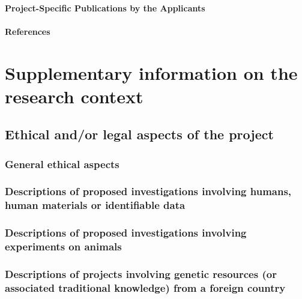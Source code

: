 \documentclass{scrartcl}
\begin{document}
\paragraph*{Project-Specific Publications by the Applicants}
\label{sec:bib}
\nocite{Desiro:18}

\printbibliography[keyword={DFG},heading=none,resetnumbers=true]
\nocite{Hoelzer:16}

\paragraph*{References}
\label{sec:references}
\newrefcontext{} %
\printbibliography[notkeyword={DFG},heading=none,resetnumbers=true]

\backmatter
\section{Supplementary information on the research context}

\subsection{Ethical and/or legal aspects of the project}

\subsubsection{General ethical aspects}

\subsubsection{Descriptions of proposed investigations involving humans, human materials or identifiable data}

\subsubsection{Descriptions of proposed investigations involving experiments on animals}

\subsubsection{Descriptions of projects involving genetic resources (or associated traditional knowledge) from a foreign country}
\end{document}
